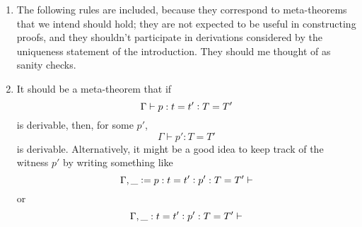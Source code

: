\documentclass[11pt]{article}
\newcommand{\equality}{=}
\newcommand{\hastype}{\vcentcolon}
\newcommand{\TYPE}{\mathop{\text{ \sc type}}}
\newcommand{\Context}{\vdash}
\newcommand{\var}{\char`_}
\newcommand{\defn}{\vcentcolon=}
\begin{document}
\begin{enumerate}
\begin{mathparpagebreakable}
\end{mathparpagebreakable}


\item
The following rules are included, because they correspond to meta-theorems that
we intend should hold; they are not expected to be useful in constructing
proofs, and they shouldn't participate in derivations considered by the
uniqueness statement of the introduction.  They should me thought of as sanity
checks.


\item
It should be a meta-theorem that if
\[{\Gamma \vdash p : t \equality t' \hastype T \equality T'}\]
is derivable, then, for some $p'$,
\[{\Gamma \vdash p' : T \equality T'}\]
is derivable.  Alternatively, it might be a good idea to keep track of the
witness $p'$ by writing something like
\[{\Gamma, \var \defn p : t \equality t' \hastype p' : T \equality T' \Context}\]
or
\[{\Gamma, \var : t \equality t' \hastype p' : T \equality T' \Context}\]

\end{enumerate}



\end{document}

